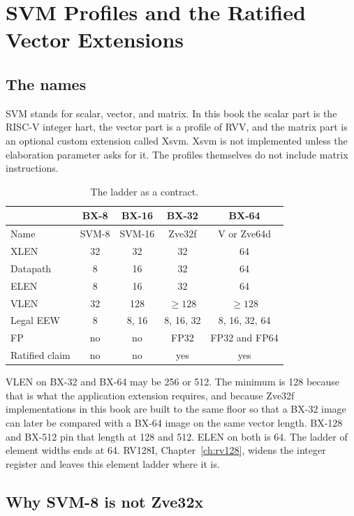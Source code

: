 \chapter{SVM Profiles and the Ratified Vector Extensions}

\section{The names}

SVM stands for scalar, vector, and matrix. In this book the scalar part is the RISC-V integer hart, the vector part is a profile of RVV, and the matrix part is an optional custom extension called Xsvm. Xsvm is not implemented unless the elaboration parameter asks for it. The profiles themselves do not include matrix instructions.

\begin{table}[htbp]
\centering
\caption{The ladder as a contract.}
\begin{tabular}{@{}lcccc@{}}
\toprule
 & BX-8 & BX-16 & BX-32 & BX-64 \\
\midrule
Name & SVM-8 & SVM-16 & Zve32f & V or Zve64d \\
XLEN & 32 & 32 & 32 & 64 \\
Datapath & 8 & 16 & 32 & 64 \\
ELEN & 8 & 16 & 32 & 64 \\
VLEN & 32 & 128 & $\ge 128$ & $\ge 128$ \\
Legal EEW & 8 & 8, 16 & 8, 16, 32 & 8, 16, 32, 64 \\
FP & no & no & FP32 & FP32 and FP64 \\
Ratified claim & no & no & yes & yes \\
\bottomrule
\end{tabular}
\end{table}

VLEN on BX-32 and BX-64 may be 256 or 512. The minimum is 128 because that is what the application extension requires, and because Zve32f implementations in this book are built to the same floor so that a BX-32 image can later be compared with a BX-64 image on the same vector length. BX-128 and BX-512 pin that length at 128 and 512. ELEN on both is 64. The ladder of element widths ends at 64. RV128I, Chapter~\ref{ch:rv128}, widens the integer register and leaves this element ladder where it is.

\section{Why SVM-8 is not Zve32x}

